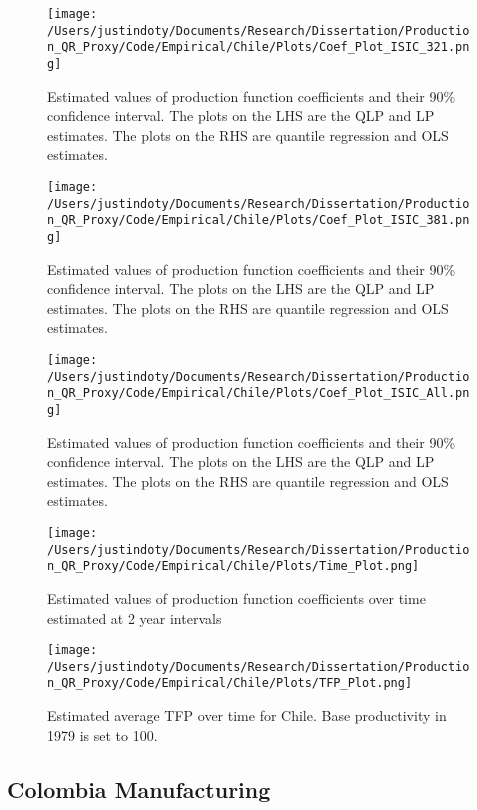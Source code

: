 \documentclass[11pt]{article}
\begin{document}
\begin{figure}[H]
\centering
\texttt{[image: /Users/justindoty/Documents/Research/Dissertation/Production\_QR\_Proxy/Code/Empirical/Chile/Plots/Coef\_Plot\_ISIC\_321.png]}
\caption{Estimated values of production function coefficients and their 90\% confidence interval. The plots on the LHS are the QLP and LP estimates. The plots on the RHS are quantile regression and OLS estimates.}
\end{figure}

\begin{figure}[H]
\centering
\texttt{[image: /Users/justindoty/Documents/Research/Dissertation/Production\_QR\_Proxy/Code/Empirical/Chile/Plots/Coef\_Plot\_ISIC\_381.png]}
\caption{Estimated values of production function coefficients and their 90\% confidence interval. The plots on the LHS are the QLP and LP estimates. The plots on the RHS are quantile regression and OLS estimates.}
\end{figure}

\begin{figure}[H]
\centering
\texttt{[image: /Users/justindoty/Documents/Research/Dissertation/Production\_QR\_Proxy/Code/Empirical/Chile/Plots/Coef\_Plot\_ISIC\_All.png]}
\caption{Estimated values of production function coefficients and their 90\% confidence interval. The plots on the LHS are the QLP and LP estimates. The plots on the RHS are quantile regression and OLS estimates.}
\end{figure}

\begin{figure}[H]
\centering
\texttt{[image: /Users/justindoty/Documents/Research/Dissertation/Production\_QR\_Proxy/Code/Empirical/Chile/Plots/Time\_Plot.png]}
\caption{Estimated values of production function coefficients over time estimated at 2 year intervals}
\end{figure}

\begin{figure}[H]
\centering
\texttt{[image: /Users/justindoty/Documents/Research/Dissertation/Production\_QR\_Proxy/Code/Empirical/Chile/Plots/TFP\_Plot.png]}
\caption{Estimated average TFP over time for Chile. Base productivity in 1979 is set to 100.}
\end{figure}


\subsection{Colombia Manufacturing}
\end{document}
